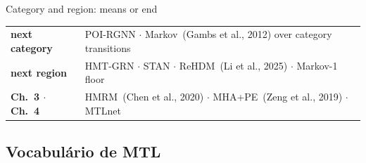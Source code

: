 \documentclass{beamer}
\begin{document}
\begin{frame}{Category and region: means or end}
    \vspace{5mm}
    {\footnotesize\setlength{\tabcolsep}{10pt}\renewcommand{\arraystretch}{1.4}
    \begin{tabular}{@{}ll@{}}
        \textbf{next category}    & POI-RGNN $\cdot$ Markov~{\scriptsize(Gambs et al., 2012)} over category transitions \\
        \textbf{next region}      & HMT-GRN $\cdot$ STAN $\cdot$ ReHDM~{\scriptsize(Li et al., 2025)} $\cdot$ Markov-1 floor \\
        \textbf{Ch.~3 $\cdot$ Ch.~4} & HMRM~{\scriptsize(Chen et al., 2020)} $\cdot$ MHA+PE~{\scriptsize(Zeng et al., 2019)} $\cdot$ MTLnet \\
    \end{tabular}\par}
\end{frame}

\subsection{Vocabulário de MTL}
\end{document}
